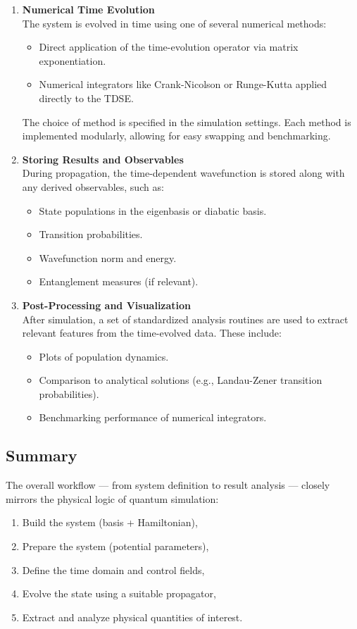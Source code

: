 \documentclass{subfiles}
\begin{document}
\begin{enumerate}
    \item \textbf{Numerical Time Evolution} \\
    The system is evolved in time using one of several numerical methods:
    \begin{itemize}
        \item Direct application of the time-evolution operator via matrix exponentiation.
        \item Numerical integrators like Crank-Nicolson or Runge-Kutta applied directly to the TDSE.
    \end{itemize}
    The choice of method is specified in the simulation settings. Each method is implemented modularly, allowing for easy swapping and benchmarking.

    \item \textbf{Storing Results and Observables} \\
    During propagation, the time-dependent wavefunction is stored along with any derived observables, such as:
    \begin{itemize}
        \item State populations in the eigenbasis or diabatic basis.
        \item Transition probabilities.
        \item Wavefunction norm and energy.
        \item Entanglement measures (if relevant).
    \end{itemize}

    \item \textbf{Post-Processing and Visualization} \\
    After simulation, a set of standardized analysis routines are used to extract relevant features from the time-evolved data. These include:
    \begin{itemize}
        \item Plots of population dynamics.
        \item Comparison to analytical solutions (e.g., Landau-Zener transition probabilities).
        \item Benchmarking performance of numerical integrators.
    \end{itemize}
\end{enumerate}

\subsection*{Summary}

The overall workflow — from system definition to result analysis — closely mirrors the physical logic of quantum simulation:
\begin{enumerate}
    \item Build the system (basis + Hamiltonian),
    \item Prepare the system (potential parameters),
    \item Define the time domain and control fields,
    \item Evolve the state using a suitable propagator,
    \item Extract and analyze physical quantities of interest.
\end{enumerate}
\end{document}
